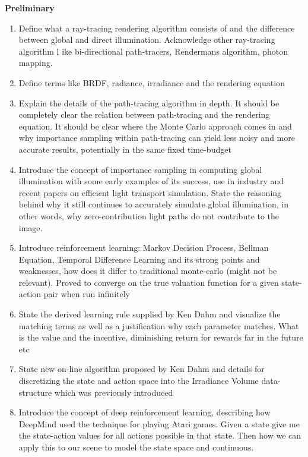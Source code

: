 \documentclass[ %
                    author={Callum Pearce},
                supervisor={Dr. Neill Campbell},
                    degree={MEng},
                     title={How effective are Temporal difference learning methods for reducing the number of zero contribution light paths while still accurately approximating Global Illumination in Path tracing?},
                  subtitle={},
                      type={research},
                      year={2019} ]{dissertation}
\begin{document}
\textbf{Preliminary}
\begin{enumerate}
\item Define what a ray-tracing rendering algorithm consists of and the difference 
between global and direct illumination. Acknowledge other ray-tracing algorithm l
ike bi-directional path-tracers, Rendermans algorithm, photon mapping. 

\item Define terms like BRDF, radiance, irradiance and the rendering equation

\item Explain the details of the path-tracing algorithm in depth. It should be 
completely clear the relation between path-tracing and the rendering equation. 
It should be clear where the Monte Carlo approach comes in and why 
importance sampling within path-tracing can yield less noisy and more accurate
 results, potentially in the same fixed time-budget

\item Introduce the concept of importance sampling in computing global 
illumination with some early examples of its success, use in industry and recent 
papers on efficient light transport simulation. State the reasoning behind why
it still continues to accurately simulate global illumination, in other words, why
zero-contribution light paths do not contribute to the image.

\item Introduce reinforcement learning: Markov Decision Process, Bellman 
Equation, Temporal Difference Learning and its strong points and weaknesses,
 how does it differ to traditional monte-carlo (might not be relevant). Proved 
 to converge on the true valuation function for a given state-action pair when 
 run infinitely

\item State the derived learning rule supplied by Ken Dahm and visualize the 
matching terms as well as a justification why each parameter matches. What 
is the value and the incentive, diminishing return for rewards far in the future etc

\item State new on-line algorithm proposed by Ken Dahm and details for 
discretizing the state and action space into the Irradiance Volume data-structure
 which was previously introduced 

\item Introduce the concept of deep reinforcement learning, describing how
 DeepMind used the technique for playing Atari games. Given a state give me 
 the state-action values for all actions possible in that state.  Then how we 
 can apply this to our scene to model the state space and continuous.
 
 

\end{enumerate}
\end{document}
